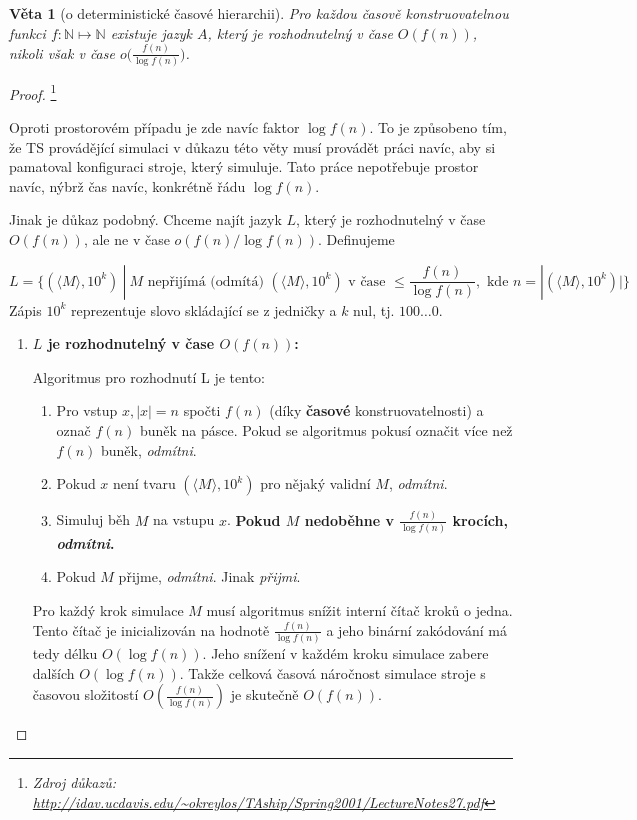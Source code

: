 \documentclass[11pt]{report} %
\newcommand{\N}{\mathbb{N}}
\newtheorem{theorem}{Věta}[section]
\numberwithin{equation}{section}
\begin{document}
\begin{theorem}[o deterministické časové hierarchii] Pro každou časově konstruovatelnou funkci $f : \N \mapsto \N$ existuje jazyk $A$, který je rozhodnutelný v čase $O(f(n))$, nikoli však v čase $o\big(\frac{f(n)}{\log f(n)}\big)$.
\end{theorem}

\begin{proof}\footnote{\textit{Zdroj důkazů: \url{http://idav.ucdavis.edu/~okreylos/TAship/Spring2001/LectureNotes27.pdf}}}
	
Oproti prostorovém případu je zde navíc faktor $\log f(n)$. To je způsobeno tím, že TS provádějící simulaci v důkazu této věty musí provádět práci navíc, aby si pamatoval konfiguraci stroje, který simuluje. Tato práce nepotřebuje prostor navíc, nýbrž čas navíc, konkrétně řádu $\log f(n)$. 

Jinak je důkaz podobný. Chceme najít jazyk $L$, který je rozhodnutelný v čase $O(f(n))$, ale ne v čase $o(f(n)/\log f(n))$. Definujeme 

$$L = \{(\langle M \rangle, 10^k)\ |\ M \text{ nepřijímá (odmítá) } (\langle M \rangle, 10^k) \text{ v čase }\leq \frac{f(n)}{\log f(n)}, \text{ kde } n = |(\langle M \rangle, 10^k)|\} $$
Zápis $10^k$ reprezentuje slovo skládající se z jedničky a $k$ nul, tj. $100\dots0$.

\begin{enumerate}
	\item \textbf{$L$ je rozhodnutelný v čase $O(f(n))$:}
	
	Algoritmus pro rozhodnutí L je tento:
	\begin{enumerate}
		
		
		\item Pro vstup $x, |x| = n$ spočti $f(n)$ (díky \textbf{časové} konstruovatelnosti) a označ $f(n)$ buněk na pásce. Pokud se algoritmus pokusí označit více než $f(n)$ buněk, \textit{odmítni}.
		\item Pokud $x$ není tvaru $(\langle M \rangle, 10^k)$ pro nějaký validní $M$, \textit{odmítni}.
		\item Simuluj běh $M$ na vstupu $x$. \textbf{Pokud $M$ nedoběhne v $\frac{f(n)}{\log f(n)}$ krocích, \textit{odmítni}.}
		\item Pokud $M$ přijme, \textit{odmítni}. Jinak \textit{přijmi}.
	\end{enumerate}
	
	Pro každý krok simulace $M$ musí algoritmus snížit interní čítač kroků o jedna. Tento čítač je inicializován na hodnotě $\frac{f(n)}{\log f(n)}$ a jeho binární zakódování má tedy délku $O(\log f(n))$. Jeho snížení v každém kroku simulace zabere dalších $O(\log f(n))$. Takže celková časová náročnost simulace stroje s časovou složitostí $O(\frac{f(n)}{\log f(n)})$ je skutečně $O(f(n))$.
	

\end{enumerate}
\end{proof}
\end{document}
